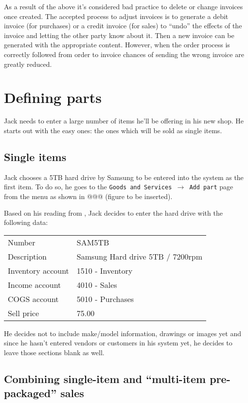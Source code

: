 As a result of the above it's considered bad practice to delete or change invoices once
created. The accepted process to adjust invoices is to generate a debit invoice (for purchases)
or a credit invoice (for sales) to ``undo'' the effects of the invoice and letting the other party
know about it. Then a new invoice can be generated with the appropriate content. However,
when the order process is correctly followed from order to invoice chances of sending the wrong
invoice are greatly reduced.

\section{Defining parts}

Jack needs to enter a large number of items he'll be offering in his new shop. He starts out
with the easy ones: the ones which will be sold as single items.

\subsection{Single items}

Jack chooses a 5TB hard drive by Samsung to be entered into the system as the first item.
To do so, he goes to the {\tt Goods and Services $\rightarrow$ Add part} page from the menu
as shown in @@@ (figure to be inserted).

Based on his reading from , Jack decides to enter the hard
drive with the following data:

\begin{tabular}{ll}
Number & SAM5TB \\
Description & Samsung Hard drive 5TB / 7200rpm \\
Inventory account & 1510 - Inventory\\
Income account & 4010 - Sales\\
COGS account & 5010 - Purchases\\
Sell price & 75.00
\end{tabular}

He decides not to include make/model information, drawings or images yet and since
he hasn't entered vendors or customers in his system yet, he decides to leave
those sections blank as well.

\subsection{Combining single-item and ``multi-item pre-packaged'' sales}

